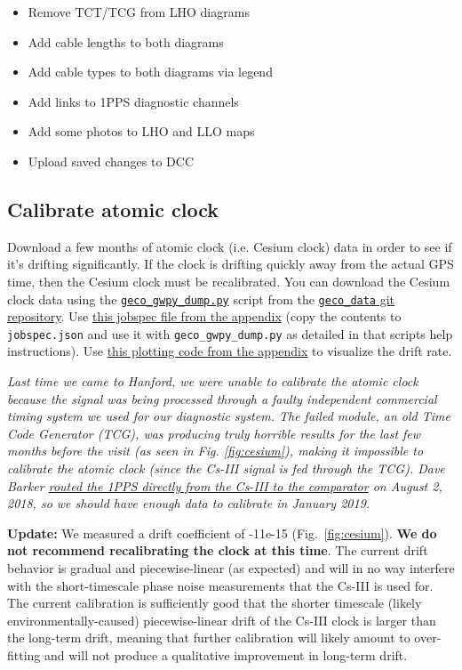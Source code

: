 \documentclass{article}
\newcommand*{\TODO}{\textcolor{todo}}
\begin{document}
\begin{itemize}
  \item{Remove TCT/TCG from LHO diagrams}
  \item{Add cable lengths to both diagrams}
  \item{\TODO{Add cable types to both diagrams via legend}}
  \item{\TODO{Add links to 1PPS diagnostic channels}}
  \item{\TODO{Add some photos to LHO and LLO maps}}
  \item{\TODO{Upload saved changes to DCC}}
\end{itemize}

\subsection{Calibrate atomic clock}

Download a few months of atomic clock (i.e. Cesium clock) data in order to see if it's drifting significantly. If the clock is drifting quickly away from the actual GPS time, then the Cesium clock must be recalibrated. You can download the Cesium clock data using the \href{https://github.com/stefco/geco_data/blob/master/geco_gwpy_dump.py}{\texttt{geco\_gwpy\_dump.py}} script from the \href{https://github.com/stefco/geco_data}{\texttt{geco\_data} git repository}. Use
\hyperref[sec:jobspec]{this jobspec file from the appendix} (copy the contents to \texttt{jobspec.json} and use it with \texttt{geco\_gwpy\_dump.py} as detailed in that scripts help instructions).
Use \hyperref[sec:plottingcode]{this plotting code from the appendix} to visualize the drift rate.

\textit{Last time we came to Hanford, we were unable to calibrate the atomic clock because the signal was being processed through a faulty independent commercial timing system we used for our diagnostic system. The failed module, an old \textit{Time Code Generator} (TCG), was producing truly horrible results for the last few months before the visit (as seen in Fig. \ref{fig:cesium}), making it impossible to calibrate the atomic clock (since the Cs-III signal is fed through the TCG). Dave Barker \href{https://alog.ligo-wa.caltech.edu/aLOG/index.php?callRep=43200}{routed the 1PPS directly from the Cs-III to the comparator} on August 2, 2018, so we should have enough data to calibrate in January 2019.}

\textbf{Update:} We measured a drift coefficient of -11e-15 (Fig.~\ref{fig:cesium}). \textbf{We do not recommend recalibrating the clock at this time}. The current drift behavior is gradual and piecewise-linear (as expected) and will in no way interfere with the short-timescale phase noise measurements that the Cs-III is used for. The current calibration is sufficiently good that the shorter timescale (likely environmentally-caused) piecewise-linear drift of the Cs-III clock is larger than the long-term drift, meaning that further calibration will likely amount to over-fitting and will not produce a qualitative improvement in long-term drift. 
\end{document}
